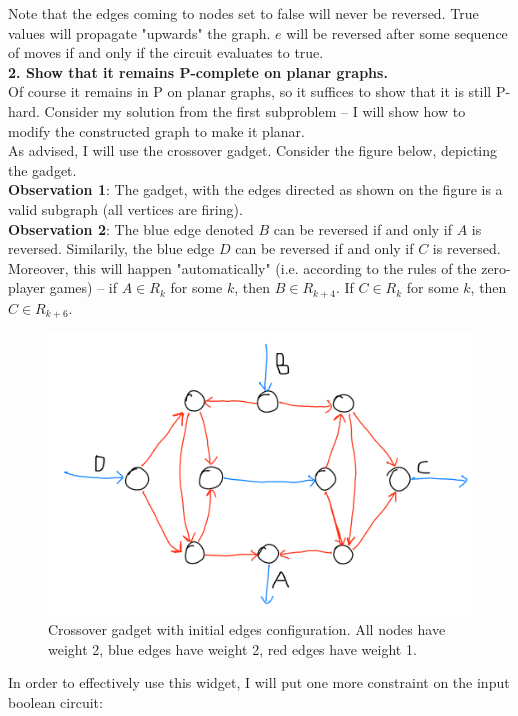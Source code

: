 Note that the edges coming to nodes set to false will never be reversed. True values will propagate
"upwards" the graph.
$e$ will be reversed after some sequence of moves if and only if the circuit evaluates to true.\\

\noindent
\textbf{2. Show that it remains P-complete on planar graphs.}\\
Of course it remains in P on planar graphs, so it suffices to show that it is still P-hard.
Consider my solution from the first subproblem -- I will show how to modify the constructed
graph to make it planar.\\
As advised, I will use the crossover gadget. Consider the figure below, depicting the gadget.\\
\textbf{Observation 1}: The gadget, with the edges directed as shown on the figure is a valid subgraph
(all vertices are firing).\\
\textbf{Observation 2}: The blue edge denoted $B$ can be reversed if and only if $A$ is reversed.
Similarily, the blue edge $D$ can be reversed if and only if $C$ is reversed. Moreover, this will
happen "automatically" (i.e. according to the rules of the zero-player games) -- if $A \in R_k$ for
some $k$, then $B \in R_{k+4}$. If $C \in R_k$ for some $k$, then $C \in R_{k+6}$.
\begin{figure}[H]
      \centering
      \caption{Crossover gadget with initial edges configuration. All nodes have weight 2,
      blue edges have weight 2, red edges have weight 1.}
      \includegraphics[scale=0.2]{content/graphics/game18.png}
\end{figure}
\noindent
In order to effectively use this widget, I will put one more constraint on the input boolean circuit:
